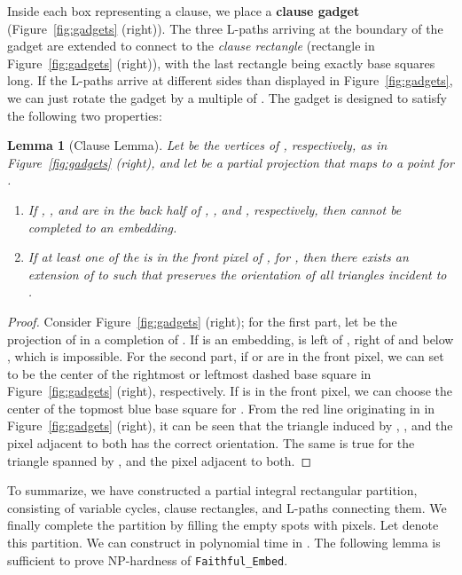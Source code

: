\documentclass[12pt]{article}
\newtheorem{lemma}[theorem]{Lemma}
\begin{document}
Inside each box representing a clause, we place a \textbf{clause gadget}
(Figure~\ref{fig:gadgets} (right)).
The three L-paths arriving at the boundary of the gadget are extended to connect
to the \emph{clause rectangle} (rectangle  in Figure~\ref{fig:gadgets} (right)), 
with the last rectangle being exactly  base squares long.
If the L-paths arrive at different sides than displayed in 
Figure~\ref{fig:gadgets}, we can just rotate the gadget by a multiple of .
The gadget is designed to satisfy the following two properties:

\begin{lemma}[Clause Lemma]\label{lem:clause_lemma}
Let  be the vertices of ,
respectively, 
as in Figure~\ref{fig:gadgets} (right), and let  be
a partial projection that maps  to a point  for .
\begin{enumerate}
\item If , , and  are in the back half
of , , and , respectively, then  cannot be completed to an embedding.
\item If at least one of the  is in the front pixel of , for , 
then there exists an extension of  to 
such that  preserves the orientation of all triangles incident to .
\end{enumerate}
\end{lemma}
\begin{proof}
Consider Figure~\ref{fig:gadgets} (right);
for the first part, let  be the projection of  in a completion of . 
If  is an embedding,  is left of ,
right of  and below , which is impossible.
For the second part, if  or  are in the front pixel,
we can set  to be the center of the rightmost or leftmost dashed base square in 
Figure~\ref{fig:gadgets} (right), respectively. If  is in the front pixel, we can
choose the center of the topmost blue base square for . From the red line
originating in  in Figure~\ref{fig:gadgets} (right), it can be seen that the triangle
induced by , , and the pixel adjacent to both has the correct orientation.
The same is true for the triangle spanned by ,  and the pixel
adjacent to both.
\end{proof}

To summarize, we have constructed a partial integral rectangular partition, consisting of
variable cycles, clause rectangles, and L-paths connecting them. We finally 
complete the partition by filling the empty spots with pixels. Let  denote
this partition. We can construct  in polynomial time in . The following lemma
is sufficient to prove NP-hardness of \texttt{Faithful\_Embed}.
\end{document}
